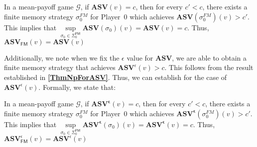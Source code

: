 \begin{corollary}
\label{CorASVEqASVFinNonEps}
In a mean-payoff game $\mathcal{G}$, if $\mathbf{ASV}(v) = c$, then for every $c' < c$, there exists a finite memory strategy $\sigma_0^{FM}$ for Player~0 which achieves $\mathbf{ASV}(\sigma_0^{FM})(v) > c'$. This implies that $\sup\limits_{\sigma_0 \in \Sigma_0^{\mathsf{FM}}} \mathbf{ASV}(\sigma_0)(v) = \mathbf{ASV}(v) = c$. Thus, $\mathbf{ASV}_{\mathsf{FM}}(v) = \mathbf{ASV}(v)$
\end{corollary}

Additionally, we note when we fix the $\epsilon$ value for $\mathbf{ASV}$, we are able to obtain a finite memory strategy that achieves $\mathbf{ASV}^{\epsilon}(v) > c$. This follows from the result established in \textbf{\cref{ThmNpForASV}}. Thus, we can establish \textbf{} for the case of $\mathbf{ASV}^{\epsilon}(v)$. Formally, we state that:

\begin{corollary}
\label{CorASVEqASVFin}
In a mean-payoff game $\mathcal{G}$, if $\mathbf{ASV^{\epsilon}}(v) = c$, then for every $c' < c$, there exists a finite memory strategy $\sigma_0^{FM}$ for Player~0 which achieves $\mathbf{ASV^{\epsilon}}(\sigma_0^{FM})(v) > c'$. This implies that $\sup\limits_{\sigma_0 \in \Sigma_0^{\mathsf{FM}}} \mathbf{ASV^{\epsilon}}(\sigma_0)(v) = \mathbf{ASV^{\epsilon}}(v) = c$. Thus, $\mathbf{ASV}^{\epsilon}_{\mathsf{FM}}(v) = \mathbf{ASV}^{\epsilon}(v)$
\end{corollary}